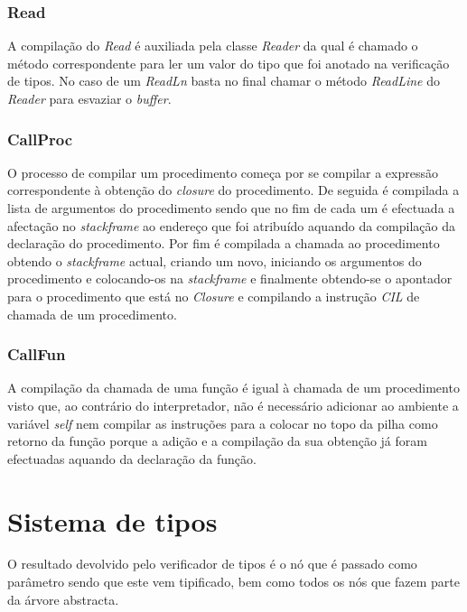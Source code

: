 \subsubsection{Read}

A compilação do \emph{Read} é auxiliada pela classe \emph{Reader} da qual é chamado o método correspondente para ler um valor do tipo que foi anotado na verificação de tipos. No caso de um \emph{ReadLn} basta no final chamar o método \emph{ReadLine} do \emph{Reader} para esvaziar o \emph{buffer}.

\subsubsection{CallProc}

O processo de compilar um procedimento começa por se compilar a expressão correspondente à obtenção do \emph{closure} do procedimento. De seguida é compilada a lista de argumentos do procedimento sendo que no fim de cada um é efectuada a afectação no \emph{stackframe} ao endereço que foi atribuído aquando da compilação da declaração do procedimento. Por fim é compilada a chamada ao procedimento obtendo o \emph{stackframe} actual, criando um novo, iniciando os argumentos do procedimento e colocando-os na \emph{stackframe} e finalmente obtendo-se o apontador para o procedimento que está no \emph{Closure} e compilando a instrução \emph{CIL} de chamada de um procedimento.

\subsubsection{CallFun}

A compilação da chamada de uma função é igual à chamada de um procedimento visto que, ao contrário do interpretador, não é necessário adicionar ao ambiente a variável \emph{self} nem compilar as instruções para a colocar no topo da pilha como retorno da função porque a adição e a compilação da sua obtenção já foram efectuadas aquando da declaração da função.

\newpage
\section{Sistema de tipos}

O resultado devolvido pelo verificador de tipos é o nó que é passado como parâmetro sendo que este vem tipificado, bem como todos os nós que fazem parte da árvore abstracta.

